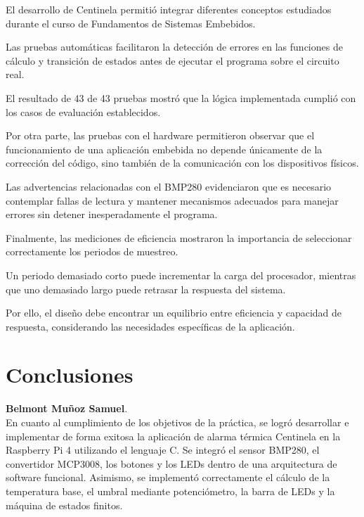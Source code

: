 \documentclass[conference]{IEEEtran}
\begin{document}
El desarrollo de Centinela permitió integrar diferentes conceptos estudiados durante el curso de Fundamentos de Sistemas Embebidos.

Las pruebas automáticas facilitaron la detección de errores en las funciones de cálculo y transición de estados antes de ejecutar el programa sobre el circuito real.

El resultado de 43 de 43 pruebas mostró que la lógica implementada cumplió con los casos de evaluación establecidos.

Por otra parte, las pruebas con el hardware permitieron observar que el funcionamiento de una aplicación embebida no depende únicamente de la corrección del código, sino también de la comunicación con los dispositivos físicos.

Las advertencias relacionadas con el BMP280 evidenciaron que es necesario contemplar fallas de lectura y mantener mecanismos adecuados para manejar errores sin detener inesperadamente el programa.

Finalmente, las mediciones de eficiencia mostraron la importancia de seleccionar correctamente los periodos de muestreo.

Un periodo demasiado corto puede incrementar la carga del procesador, mientras que uno demasiado largo puede retrasar la respuesta del sistema.

Por ello, el diseño debe encontrar un equilibrio entre eficiencia y capacidad de respuesta, considerando las necesidades específicas de la aplicación.


\section{Conclusiones}


\textbf{Belmont Muñoz Samuel}.\\
En cuanto al cumplimiento de los objetivos de la práctica, se logró desarrollar e implementar de forma exitosa la aplicación de alarma térmica Centinela en la Raspberry Pi 4 utilizando el lenguaje C. Se integró el sensor BMP280, el convertidor MCP3008, los botones y los LEDs dentro de una arquitectura de software funcional. Asimismo, se implementó correctamente el cálculo de la temperatura base, el umbral mediante potenciómetro, la barra de LEDs y la máquina de estados finitos.
\end{document}
